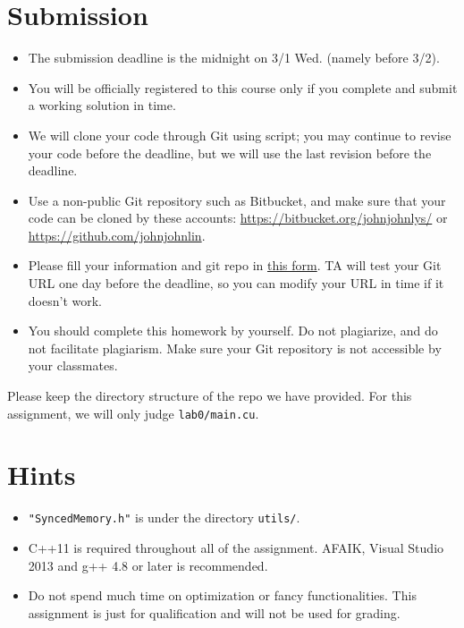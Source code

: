 \documentclass[12pt,a4paper]{article}
\begin{document}
\section{Submission}
\begin{itemize}
\item The submission deadline is the midnight on 3/1 Wed. (namely before 3/2).
\item You will be officially registered to this course only if you complete and submit a working solution in time.
\item We will clone your code through Git using script; you may continue to revise your code before the deadline, but we will use the last revision before the deadline.
\item Use a non-public Git repository such as Bitbucket, and make sure that your code can be cloned by these accounts: \url{https://bitbucket.org/johnjohnlys/} or \url{https://github.com/johnjohnlin}.
\item Please fill your information and git repo in \href{https://goo.gl/forms/1R7p6QRMlrnKuImu1}{this form}. TA will test your Git URL one day before the deadline, so you can modify your URL in time if it doesn't work.
\item You should complete this homework by yourself. Do not plagiarize, and do not facilitate plagiarism.  Make sure your Git repository is not accessible by your classmates.
\end{itemize}

Please keep the directory structure of the repo we have provided. For this assignment, we will only judge \verb+lab0/main.cu+.

\section{Hints}

\begin{itemize}
\item \verb+"SyncedMemory.h"+ is under the directory \verb+utils/+.
\item C++11 is required throughout all of the assignment. AFAIK, Visual Studio 2013 and g++ 4.8 or later is recommended.
\item Do not spend much time on optimization or fancy functionalities. This assignment is just for qualification and will not be used for grading.
\end{itemize}
\end{document}

